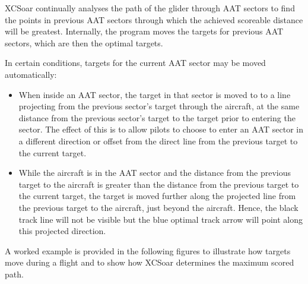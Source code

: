 XCSoar continually analyses the path of the glider through AAT sectors
to find the points in previous AAT sectors through which the achieved
scoreable distance will be greatest.  Internally, the program moves
the targets for previous AAT sectors, which are then the optimal
targets.

In certain conditions, targets for the current AAT sector may be moved
automatically:
\begin{itemize}
\item When inside an AAT sector, the target in that sector is moved to
to a line projecting from the previous sector's target through the
aircraft, at the same distance from the previous sector's target to
the target prior to entering the sector.  The effect of this is to
allow pilots to choose to enter an AAT sector in a different direction
or offset from the direct line from the previous target to the current
target.

\item While the aircraft is in the AAT sector and the distance from the
previous target to the aircraft is greater than the distance from the
previous target to the current target, the target is moved further
along the projected line from the previous target to the aircraft,
just beyond the aircraft.  Hence, the black track line will not be
visible but the blue optimal track arrow will point along this
projected direction.
\end{itemize}

A worked example is provided in the following figures to illustrate
how targets move during a flight and to show how XCSoar determines the
maximum scored path.

